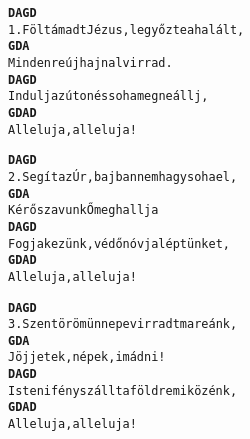 \begin{minipage}{\textwidth}
\kottastart
{}
\kottaend
\begin{minipage}{\textwidth}
\begin{multicols}{2}
\begin{minipage}{\textwidth}
\begin{alltt}
\textbf{   D          A         G         D}
1. Föltámadt Jézus, legyőzte a halált,
\textbf{   G        D          A}
   Mindenre új hajnal virrad.
\textbf{   D         A       G           D}
   Indulj az úton és soha meg ne állj,
\textbf{   G      D  A     D}
   Alleluja, alleluja!
\end{alltt}
\vspace{0.0cm}
\versszakspacing
\end{minipage}
\begin{minipage}{\textwidth}
\begin{alltt}
\textbf{   D        A          G            D}
2. Segít az Úr, bajban nem hagy soha el,
\textbf{   G        D         A}
   Kérő szavunk Ő meghallja
\textbf{   D        A          G           D}
   Fogja kezünk, védőn óvja léptünket,
\textbf{   G      D  A     D}
   Alleluja, alleluja!
\end{alltt}
\vspace{0.0cm}
\versszakspacing
\end{minipage}
\begin{minipage}{\textwidth}
\begin{alltt}
\textbf{   D          A      G            D}
3. Szent öröm ünnepe virradt ma reánk,
\textbf{   G          D       A}
   Jöjjetek, népek, imádni!
\textbf{   D       A             G          D}
   Isteni fény szállt a földre miközénk,
\textbf{   G      D  A     D}
   Alleluja, alleluja!
\end{alltt}
\vspace{0.0cm}
\versszakspacing
\end{minipage}
\vspace{0.2cm}
\end{multicols}
\end{minipage}

\end{minipage}
~\vspace{1.0cm}
\newline
